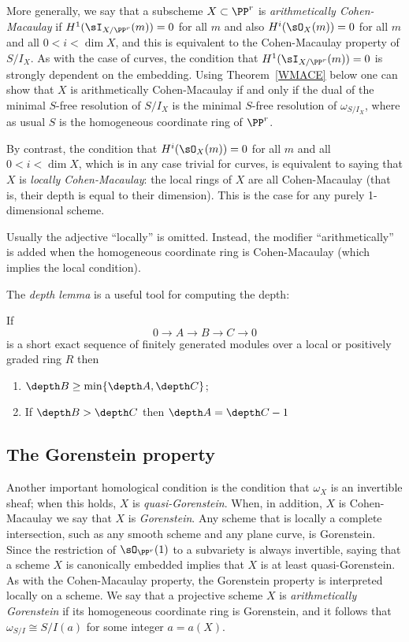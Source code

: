 More generally, we say that a subscheme $X\subset \PP^r$ is \emph{arithmetically Cohen-Macaulay}
if $H^1(\sI_{X/\PP^r}(m)) = 0$ for all $m$ and also $H^i(\sO_X(m)) = 0$ for all $m$ and all $0<i<\dim X$,
and this is equivalent to the Cohen-Macaulay property of $S/I_X$. As with the case of curves,
the condition that $H^1(\sI_{X/\PP^r}(m)) = 0$ 
is strongly dependent on the embedding. Using Theorem~\ref{WMACE} below one can show
that $X$ is arithmetically Cohen-Macaulay if and only if the dual of the minimal $S$-free resolution
of $S/I_X$ is the minimal $S$-free resolution of $\omega_{S/I_X}$, where as usual $S$ is the
homogeneous coordinate ring of $\PP^r$.


By contrast, the condition
that $H^i(\sO_X(m)) = 0$ for all $m$ and all $0<i<\dim X$, which is in any case trivial for curves, is 
equivalent to saying that $X$ is \emph{locally Cohen-Macaulay}: the local rings of $X$ are all Cohen-Macaulay (that is, their depth is equal to their dimension). This is the case for any purely 1-dimensional scheme. 

Usually the adjective ``locally'' is omitted. Instead, the 
modifier ``arithmetically'' is added when the homogeneous coordinate ring is Cohen-Macaulay (which implies the local condition).

The \emph{depth lemma} \cite[***]{Eisenbud1995} is a useful tool for computing the depth:

\begin{lemma}\label{depth lemma}
If 
$$
0\to A\to B\to C\to 0
$$
is a short exact sequence of finitely generated modules over a local or positively graded ring $R$ then
\begin{enumerate}
\item $\depth B \geq \min\{\depth A, \depth C\}$;
 \item If $\depth B>\depth C$ then $\depth A = \depth C -1$
\end{enumerate}
\end{lemma}


\subsection{The Gorenstein property} 
Another important homological condition is the condition that $\omega_X$ is an invertible sheaf; when this holds, $X$ is \emph{quasi-Gorenstein}. When, in addition, $X$ is Cohen-Macaulay we say that $X$ is \emph{Gorenstein}. Any scheme that is locally a complete intersection, such as any smooth scheme and any plane curve, is Gorenstein. Since the restriction
of $\sO_{\PP^r}(1)$ to a subvariety is always invertible, saying that a scheme $X$ is canonically embedded implies that
$X$ is at least quasi-Gorenstein. As with the Cohen-Macaulay property, the Gorenstein property is interpreted locally
on a scheme. We say that a projective scheme $X$ is \emph{arithmetically Gorenstein}
if its homogeneous coordinate ring is Gorenstein, and it follows that $\omega_{S/I} \cong S/I(a)$ for some integer $a = a(X)$.

